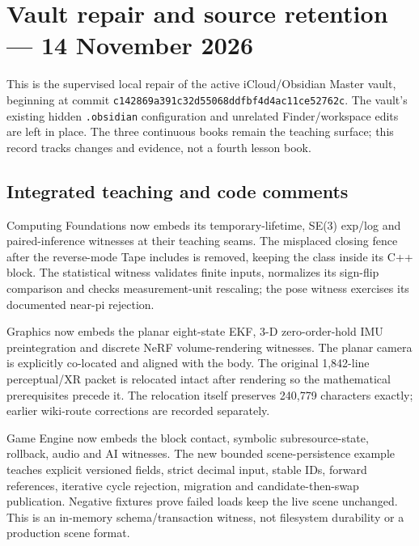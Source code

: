 \hypertarget{appendix-faa2b5a8e820}{}\label{referencestart:appendix-faa2b5a8e820}
\section{Vault repair and source retention --- 14 November 2026}\label{appendix-faa2b5a8e820-vault-repair-and-source-retention-14-november-2026}

\hypertarget{appendix-faa2b5a8e820-vault-repair-and-source-retention-14-november-2026}{}

This is the supervised local repair of the active iCloud/Obsidian Master vault, beginning at commit \texttt{c142869a391c32d55068ddfbf4d4ac11ce52762c}. The vault's existing hidden \texttt{.obsidian} configuration and unrelated Finder/workspace edits are left in place. The three continuous books remain the teaching surface; this record tracks changes and evidence, not a fourth lesson book.

\subsection{Integrated teaching and code comments}\label{appendix-faa2b5a8e820-integrated-teaching-and-code-comments}

\hypertarget{appendix-faa2b5a8e820-integrated-teaching-and-code-comments}{}

Computing Foundations now embeds its temporary-lifetime, SE(3) exp/log and paired-inference witnesses at their teaching seams. The misplaced closing fence after the reverse-mode Tape includes is removed, keeping the class inside its C++ block. The statistical witness validates finite inputs, normalizes its sign-flip comparison and checks measurement-unit rescaling; the pose witness exercises its documented near-pi rejection.

Graphics now embeds the planar eight-state EKF, 3-D zero-order-hold IMU preintegration and discrete NeRF volume-rendering witnesses. The planar camera is explicitly co-located and aligned with the body. The original 1,842-line perceptual/XR packet is relocated intact after rendering so the mathematical prerequisites precede it. The relocation itself preserves 240,779 characters exactly; earlier wiki-route corrections are recorded separately.

Game Engine now embeds the block contact, symbolic subresource-state, rollback, audio and AI witnesses. The new bounded scene-persistence example teaches explicit versioned fields, strict decimal input, stable IDs, forward references, iterative cycle rejection, migration and candidate-then-swap publication. Negative fixtures prove failed loads keep the live scene unchanged. This is an in-memory schema/transaction witness, not filesystem durability or a production scene format.


